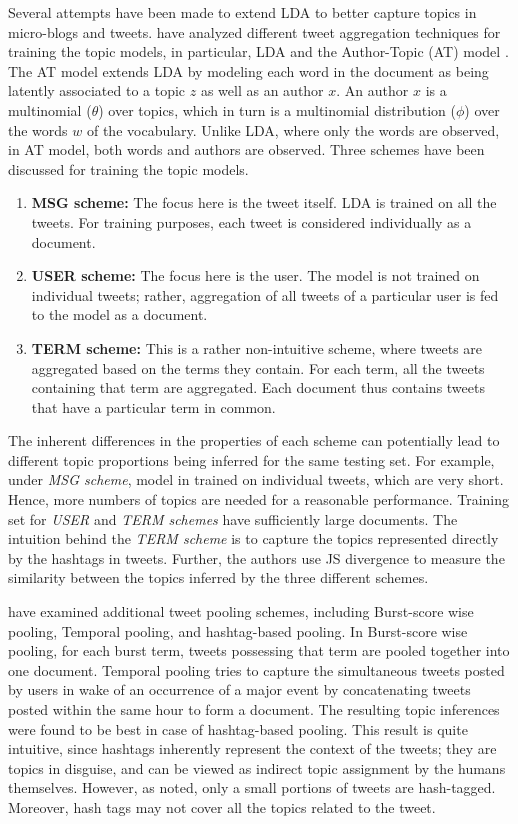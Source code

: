 Several attempts have been made to extend LDA to better capture topics in micro-blogs and tweets. \cite{hong2010empirical} have analyzed different tweet aggregation techniques for training the topic models, in particular, LDA and the Author-Topic (AT) model \cite{rosen2004author}. The AT model extends LDA by modeling each word in the document as being latently associated to a topic $z$ as well as an author $x$. An author $x$ is a multinomial ($\theta$) over topics, which in turn is a multinomial distribution ($\phi$) over the words $w$ of the vocabulary. Unlike LDA, where only the words are observed, in AT model, both words and authors are observed. Three schemes have been discussed for training the topic models.
\begin{enumerate}
\item {\bf MSG scheme:} The focus here is the tweet itself. LDA is trained on all the tweets. For training purposes, each tweet is considered individually as a document.\\
\item {\bf USER scheme:} The focus here is the user. The model is not trained on individual tweets; rather, aggregation of all tweets of a particular user is fed to the model as a document.\\ 
\item {\bf TERM scheme:} This is a rather non-intuitive scheme, where tweets are aggregated based on the terms they contain. For each term, all the tweets containing that term are aggregated. Each document thus contains tweets that have a particular term in common.
\end{enumerate}

The inherent differences in the properties of each scheme can potentially lead to different topic proportions being inferred for the same testing set. For example, under \emph{MSG scheme}, model in trained on individual tweets, which are very short. Hence, more numbers of topics are needed for a reasonable performance. Training set for \emph{USER} and \emph{TERM schemes} have sufficiently large documents. The intuition behind the \emph{TERM scheme} is to capture the topics represented directly by the hashtags in tweets. Further, the authors use JS divergence to measure the similarity between the topics inferred by the three different schemes.

\cite{mehrotra2013improving} have examined additional tweet pooling schemes, including Burst-score wise pooling, Temporal pooling, and hashtag-based pooling. In Burst-score wise pooling, for each burst term, tweets possessing that term are pooled together into one document. Temporal pooling tries to capture the simultaneous tweets posted by users in wake of an occurrence of a major event by concatenating tweets posted within the same hour to form a document. The resulting topic inferences were found to be best in case of hashtag-based pooling. This result is quite intuitive, since hashtags inherently represent the context of the tweets; they are topics in disguise, and can be viewed as indirect topic assignment by the humans themselves. However, as noted, only a small portions of tweets are hash-tagged. Moreover, hash tags may not cover all the topics related to the tweet.

